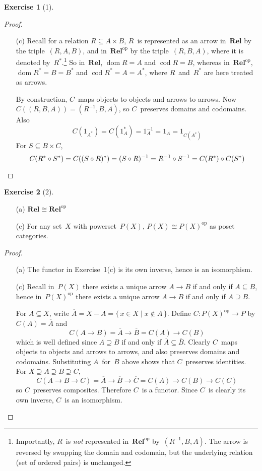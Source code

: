 \documentclass[letterpaper,12pt]{article}
\newcommand{\Rel}{\mathbf{Rel}}
\newcommand{\iso}{\cong}
\DeclareMathOperator{\dom}{dom}
\DeclareMathOperator{\cod}{cod}
\newcommand{\comp}[1]{\overline{#1}}
\renewcommand{\star}[1]{#1^{*}}
\newcommand{\dual}[1]{#1^{\mathrm{op}}}
\theoremstyle{definition}
\newtheorem*{exer}{Exercise}
\theoremstyle{remark}
\theoremstyle{direction}
\begin{document}
\begin{exer}[1]
\begin{proof}
\begin{enumerate}[itemsep=0pt]
\item[(c)] Recall for a relation \(R\subseteq A\times B\), \(R\)~is represented as an arrow in~\(\Rel\) by the triple~\((R,A,B)\), and in~\(\dual{\Rel}\) by the triple~\((R,B,A)\), where it is denoted by~\(\star{R}\).\footnote{Importantly, \(R\)~is \emph{not} represented in~\(\dual{\Rel}\) by~\((R^{-1},B,A)\). The arrow is reversed by swapping the domain and codomain, but the underlying relation (set of ordered pairs) is unchanged.} So in~\(\Rel\), \(\dom R=A\) and \(\cod R=B\), whereas in~\(\dual{\Rel}\), \(\dom\star{R}=B=\star{B}\) and \(\cod\star{R}=A=\star{A}\), where \(R\)~and~\(\star{R}\) are here treated as arrows.

By construction, \(C\)~maps objects to objects and arrows to arrows. Now \(C((R,B,A))=(R^{-1},B,A)\), so \(C\)~preserves domains and codomains. Also
\[C(1_{\star{A}})=C(\star{1_A})=1_A^{-1}=1_A=1_{C(\star{A})}\]
For \(S\subseteq B\times C\),
\[C(\star{R}\circ\star{S})=C(\star{(S\circ R)})=(S\circ R)^{-1}=R^{-1}\circ S^{-1}=C(\star{R})\circ C(\star{S})\qedhere\]
\end{enumerate}
\end{proof}
\end{exer}

\begin{exer}[2]\
\begin{enumerate}[itemsep=0pt]
\item[(a)] \(\Rel\iso\dual{\Rel}\)
\item[(c)] For any set~\(X\) with powerset~\(P(X)\), \(P(X)\iso\dual{P(X)}\) as poset categories.
\end{enumerate}
\begin{proof}\
\begin{enumerate}[itemsep=0pt]
\item[(a)] The functor in Exercise~1(c) is its own inverse, hence is an isomorphism.
\item[(c)] Recall in~\(P(X)\) there exists a unique arrow \(A\to B\) if and only if \(A\subseteq B\), hence in~\(\dual{P(X)}\) there exists a unique arrow \(A\to B\) if and only if \(A\supseteq B\).

For \(A\subseteq X\), write \(\comp{A}=X-A=\{\,x\in X\mid x\not\in A\,\}\). Define \(C:\dual{P(X)}\to P\) by \(C(A)=\comp{A}\) and
\[C(A\to B)=\comp{A}\to\comp{B}=C(A)\to C(B)\]
which is well defined since \(A\supseteq B\) if and only if \(\comp{A}\subseteq\comp{B}\). Clearly \(C\)~maps objects to objects and arrows to arrows, and also preserves domains and codomains. Substituting \(A\)~for~\(B\) above shows that \(C\)~preserves identities. For \(X\supseteq A\supseteq B\supseteq C\),
\[C(A\to B\to C)=\comp{A}\to\comp{B}\to\comp{C}=C(A)\to C(B)\to C(C)\]
so \(C\)~preserves composites. Therefore \(C\)~is a functor. Since \(C\)~is clearly its own inverse, \(C\)~is an isomorphism.\qedhere
\end{enumerate}
\end{proof}
\end{exer}
\end{document}
